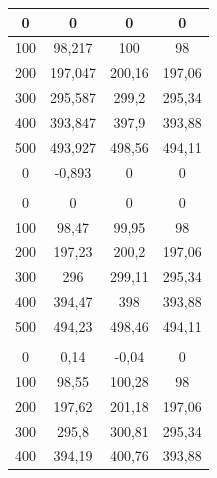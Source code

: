 \documentclass[a4paper, twoside]{article}
\begin{document}
\begin{table}[H]
{\begin{tabular}{|c|c|c|c|}
        \hline
        0 & 0 & 0 & 0 \\
        \hline
        100 & 98,217 & 100 & 98 \\
        \hline
        200 & 197,047 & 200,16 & 197,06 \\
        \hline
        300 & 295,587 & 299,2 & 295,34 \\
        \hline
        400 & 393,847 & 397,9 & 393,88 \\
        \hline
        500 & 493,927 & 498,56 & 494,11 \\
        \hline
        0 & -0,893 & 0 & 0 \\
        \hline
        \rowcolor{rowlight}
        \multicolumn{4}{|c|}{\textbf{Quarta serie}} \\
        \hline
        0 & 0 & 0 & 0 \\
        \hline
        100 & 98,47 & 99,95 & 98 \\
        \hline
        200 & 197,23 & 200,2 & 197,06 \\
        \hline
        300 & 296 & 299,11 & 295,34 \\
        \hline
        400 & 394,47 & 398 & 393,88 \\
        \hline
        500 & 494,23 & 498,46 & 494,11 \\
        \hline
        \rowcolor{rowlight}
        \multicolumn{4}{|c|}{\textbf{Quinta serie}} \\
        \hline
        0 & 0,14 & -0,04 & 0 \\
        \hline
        100 & 98,55 & 100,28 & 98 \\
        \hline
        200 & 197,62 & 201,18 & 197,06 \\
        \hline
        300 & 295,8 & 300,81 & 295,34 \\
        \hline
        400 & 394,19 & 400,76 & 393,88 \\
        \hline
    \end{tabular}%
    
    \hspace{0.5cm} %
    
}
\end{table}
\end{document}
